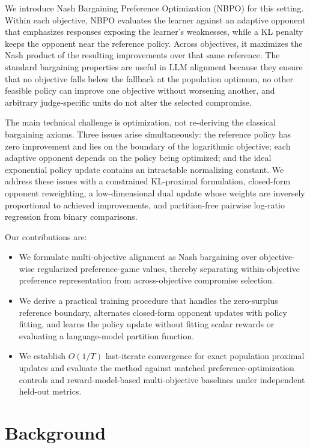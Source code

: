 \documentclass{article}
\theoremstyle{remark}
\theoremstyle{plain}
\newcommand{\NBPO}{\textsc{NBPO}}
\begin{document}
We introduce Nash Bargaining Preference Optimization (\NBPO{}) for this setting. Within each objective, \NBPO{} evaluates the learner against an adaptive opponent that emphasizes responses exposing the learner's weaknesses, while a KL penalty keeps the opponent near the reference policy. Across objectives, it maximizes the Nash product of the resulting improvements over that same reference. The standard bargaining properties are useful in LLM alignment because they ensure that no objective falls below the fallback at the population optimum, no other feasible policy can improve one objective without worsening another, and arbitrary judge-specific units do not alter the selected compromise.

The main technical challenge is optimization, not re-deriving the classical bargaining axioms. Three issues arise simultaneously: the reference policy has zero improvement and lies on the boundary of the logarithmic objective; each adaptive opponent depends on the policy being optimized; and the ideal exponential policy update contains an intractable normalizing constant. We address these issues with a constrained KL-proximal formulation, closed-form opponent reweighting, a low-dimensional dual update whose weights are inversely proportional to achieved improvements, and partition-free pairwise log-ratio regression from binary comparisons.

Our contributions are:
\begin{itemize}
    \item We formulate multi-objective alignment as Nash bargaining over objective-wise regularized preference-game values, thereby separating within-objective preference representation from across-objective compromise selection.
    \item We derive a practical training procedure that handles the zero-surplus reference boundary, alternates closed-form opponent updates with policy fitting, and learns the policy update without fitting scalar rewards or evaluating a language-model partition function.
    \item We establish $O(1/T)$ last-iterate convergence for exact population proximal updates and evaluate the method against matched preference-optimization controls and reward-model-based multi-objective baselines under independent held-out metrics.
\end{itemize}

\section{Background}
\label{sec:background}
\end{document}
